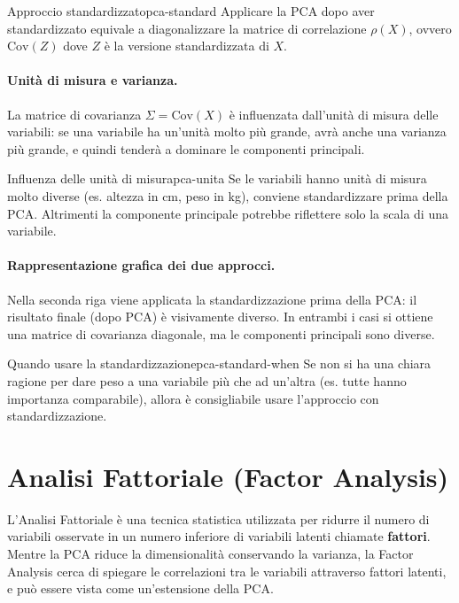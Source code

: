 \begin{nota}{Approccio standardizzato}{pca-standard}
Applicare la PCA dopo aver standardizzato equivale a diagonalizzare la matrice di correlazione \( \rho(X) \), ovvero \( \mathrm{Cov}(Z) \) dove \( Z \) è la versione standardizzata di \( X \).
\end{nota}

\paragraph{Unità di misura e varianza.}
La matrice di covarianza \( \Sigma = \mathrm{Cov}(X) \) è influenzata dall’unità di misura delle variabili: se una variabile ha un’unità molto più grande, avrà anche una varianza più grande, e quindi tenderà a dominare le componenti principali.

\begin{nota}{Influenza delle unità di misura}{pca-unita}
Se le variabili hanno unità di misura molto diverse (es. altezza in cm, peso in kg), conviene standardizzare prima della PCA. Altrimenti la componente principale potrebbe riflettere solo la scala di una variabile.
\end{nota}

\paragraph{Rappresentazione grafica dei due approcci.}

Nella seconda riga viene applicata la standardizzazione prima della PCA: il risultato finale (dopo PCA) è visivamente diverso. In entrambi i casi si ottiene una matrice di covarianza diagonale, ma le componenti principali sono diverse.

\begin{nota}{Quando usare la standardizzazione}{pca-standard-when}
Se non si ha una chiara ragione per dare peso a una variabile più che ad un'altra (es. tutte hanno importanza comparabile), allora è consigliabile usare l'approccio con standardizzazione.
\end{nota}



\section{Analisi Fattoriale (Factor Analysis)}\label{sec:factor-analysis}

L'Analisi Fattoriale è una tecnica statistica utilizzata per ridurre il numero di variabili osservate in un numero inferiore di variabili latenti chiamate \textbf{fattori}. Mentre la PCA riduce la dimensionalità conservando la varianza, la Factor Analysis cerca di spiegare le correlazioni tra le variabili attraverso fattori latenti, e può essere vista come un'estensione della PCA.

